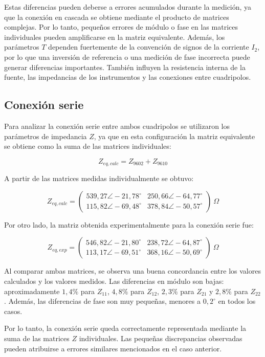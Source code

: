 Estas diferencias pueden deberse a errores acumulados durante la medición,
ya que la conexión en cascada se obtiene mediante el producto de matrices
complejas. Por lo tanto, pequeños errores de módulo o fase en las matrices
individuales pueden amplificarse en la matriz equivalente. Además, los
parámetros \(T\) dependen fuertemente de la convención de signos de la
corriente \(I_2\), por lo que una inversión de referencia o una medición de fase
incorrecta puede generar diferencias importantes. También influyen la
resistencia interna de la fuente, las impedancias de los instrumentos y las
conexiones entre cuadripolos.

\subsection{Conexión serie}

Para analizar la conexión serie entre ambos cuadripolos se utilizaron los
parámetros de impedancia \(Z\), ya que en esta configuración la matriz
equivalente se obtiene como la suma de las matrices individuales:

\[
Z_{eq,calc}=Z_{9602}+Z_{9610}
\]

A partir de las matrices medidas individualmente se obtuvo:

\[
Z_{eq,calc}=
\begin{pmatrix}
539,27\angle -21,78^\circ & 250,66\angle -64,77^\circ\\
115,82\angle -69,48^\circ & 378,84\angle -50,57^\circ
\end{pmatrix}
\ \Omega
\]

Por otro lado, la matriz obtenida experimentalmente para la conexión serie fue:

\[
Z_{eq,exp}=
\begin{pmatrix}
546,82\angle -21,80^\circ & 238,72\angle -64,87^\circ\\
113,17\angle -69,51^\circ & 368,16\angle -50,69^\circ
\end{pmatrix}
\ \Omega
\]

Al comparar ambas matrices, se observa una buena concordancia entre los
valores calculados y los valores medidos. Las diferencias en módulo son bajas:
aproximadamente \(1,4\%\) para \(Z_{11}\), \(4,8\%\) para \(Z_{12}\),
\(2,3\%\) para \(Z_{21}\) y \(2,8\%\) para \(Z_{22}\). Además, las diferencias
de fase son muy pequeñas, menores a \(0,2^\circ\) en todos los casos.

Por lo tanto, la conexión serie queda correctamente representada mediante la
suma de las matrices \(Z\) individuales. Las pequeñas discrepancias observadas
pueden atribuirse a errores similares mencionados en el caso anterior.
